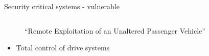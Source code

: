 \documentclass{beamer}
\begin{document}
\begin{frame}{Security critical systems - vulnerable}
\begin{columns}
\begin{column}{0.5\textwidth}
\begin{figure}
                \caption{``Remote Exploitation of an Unaltered Passenger Vehicle'' \cite{greenberg_hackers_2015,miller_remote_2015}}
                \label{jeep_offroad}
            \end{figure}
            \pause
            \begin{itemize}
                \item Total control of drive systems
            \end{itemize}
        \end{column}
    \end{columns}
\end{frame}


\end{document}
